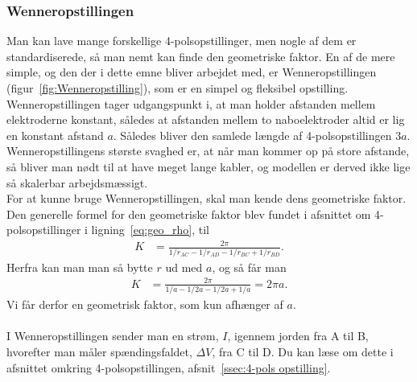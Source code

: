 \subsubsection{Wenneropstillingen}
 Man kan lave mange forskellige 4-polsopstillinger, men nogle af dem er standardiserede, så man nemt kan finde den geometriske faktor.
 En af de mere simple, og den der i dette emne bliver arbejdet med, er Wenneropstillingen (figur~\ref{fig:Wenneropstilling}), som er en simpel og fleksibel opstilling. Wenneropstillingen tager udgangspunkt i, at man holder afstanden mellem elektroderne konstant, således at afstanden mellem to naboelektroder altid er lig en konstant afstand $a$. Således bliver den samlede længde af 4-polsopstillingen $3a$. \\
 Wenneropstillingens største svaghed er, at når man kommer op på store afstande, så bliver man nødt til at have meget lange kabler, og modellen er derved ikke lige så skalerbar arbejdsmæssigt. \\
 For at kunne bruge Wenneropstillingen, skal man kende dens geometriske faktor. Den generelle formel for den geometriske faktor blev fundet i afsnittet om 4-polsopstillinger i ligning~\eqref{eq:geo_rho}, til \\
 \begin{align}
     K&=\frac{2\pi}{1/r_{AC} - 1/r_{AD} - 1/r_{BC} + 1/r_{BD}}. 
 \end{align}
Herfra kan man man så bytte $r$ ud med $a$, og så får man
\begin{align}
     K&=\frac{2\pi}{1/a - 1/2a - 1/2a + 1/a} = 2\pi a.
 \end{align}
Vi får derfor en geometrisk faktor, som kun afhænger af $a$. \\ \\
%
%
I Wenneropstillingen sender man en strøm, $I$, igennem jorden fra A til B, hvorefter man måler spændingsfaldet, $\Delta V$, fra C til D. Du kan læse om dette i afsnittet omkring 4-polsopstillingen, afsnit~\ref{ssec:4-pols opstilling}.
%

